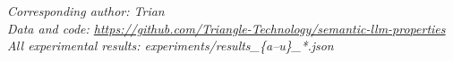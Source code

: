 \documentclass[11pt,a4paper]{article}
\begin{document}

\vspace{1em}
\noindent\emph{Corresponding author: Trian}\\
\noindent\emph{Data and code: \url{https://github.com/Triangle-Technology/semantic-llm-properties}}\\
\noindent\emph{All experimental results: experiments/results\_\{a--u\}\_*.json}



\end{document}
